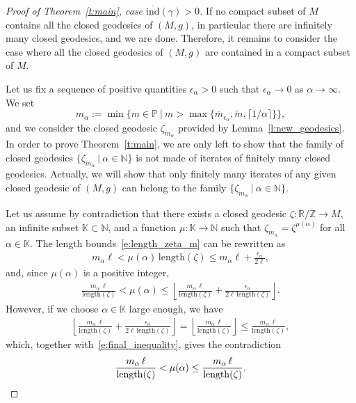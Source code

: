 \documentclass[reqno]{amsart}
\numberwithin{equation}{section}
\theoremstyle{personal}%
\theoremstyle{definition}
\newcommand{\N}{\mathds{N}}
\newcommand{\Z}{\mathds{Z}}
\newcommand{\R}{\mathds{R}}
\newcommand{\PP}{\mathds{P}}
\newcommand{\K}{\mathds{K}}
\newcommand{\avind}{\overline{\ind}}
\newcommand{\ind}{\mathrm{ind}}
\begin{document}
\begin{proof}[Proof of Theorem~\ref{t:main}, case $\avind(\gamma)>0$]
If no compact subset of $M$ contains all the closed geodesics of $(M,g)$, in particular there are infinitely many closed geodesics, and we are done. Therefore, it remains to consider the case where all the closed geodesics of $(M,g)$ are contained in a compact subset of $M$. 


Let us fix a sequence of positive quantities $\epsilon_\alpha>0$ such that $\epsilon_\alpha\to0$ as $\alpha\to\infty$. We set 
\[m_\alpha:=\min\big\{ m\in\PP\ \big|\ m>\max\{\overline m_{\epsilon_\alpha},\tilde m,\lceil1/\alpha\rceil\} \big\},\] 
and we consider the closed geodesic $\zeta_{m_\alpha}$ provided by Lemma~\ref{l:new_geodesics}. In order to prove Theorem~\ref{t:main}, we are only left to show that the family of closed geodesics $\{\zeta_{m_\alpha}\ |\ \alpha\in\N\}$ is not made of iterates of finitely many closed geodesics. Actually, we will show that only finitely many iterates of any given closed geodesic of $(M,g)$ can belong to the family $\{\zeta_{m_\alpha}\ |\ \alpha\in\N\}$. 

Let us assume by contradiction that there exists a closed geodesic $\zeta:\R/\Z\to M$, an infinite subset $\K\subset\N$, and a function $\mu:\K\to\N$ such that $\zeta_{m_\alpha}=\zeta^{\mu(\alpha)}$ for all $\alpha\in\K$. The length bounds~\eqref{e:length_zeta_m} can be rewritten as 
\begin{align*}
 m_\alpha\ell < \mu(\alpha)\,\mathrm{length}(\zeta) \leq m_\alpha\ell+\tfrac{\epsilon_\alpha}{2\ell},
\end{align*}
and, since $\mu(\alpha)$ is a positive integer,
\begin{align}
\label{e:final_inequality}
\frac{m_\alpha\,\ell}{\mathrm{length}(\zeta)}
<
\mu(\alpha)
\leq
\left\lfloor 
\frac{m_\alpha\,\ell}{\mathrm{length}(\zeta)}
+
\frac{\epsilon_\alpha}{2\ell\,\mathrm{length}(\zeta)}
\right\rfloor.
\end{align}
However, if we choose $\alpha\in\K$ large enough, we have
\begin{align*}
\left\lfloor 
\frac{m_\alpha\,\ell}{\mathrm{length}(\zeta)}
+
\frac{\epsilon_\alpha}{2\ell\,\mathrm{length}(\zeta)}
\right\rfloor
=
\left\lfloor 
\frac{m_\alpha\,\ell}{\mathrm{length}(\zeta)}
\right\rfloor
\leq
\frac{m_\alpha\,\ell}{\mathrm{length}(\zeta)},
\end{align*}
which, together with~\eqref{e:final_inequality}, gives the contradiction
\[
\frac{m_\alpha\,\ell}{\mathrm{length}(\zeta)}
<
\mu(\alpha)
\leq
\frac{m_\alpha\,\ell}{\mathrm{length}(\zeta)}.
\qedhere
\]
\end{proof}
\end{document}
